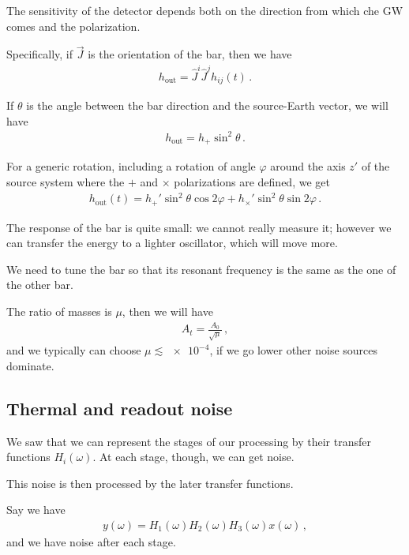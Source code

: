 \documentclass[main.tex]{subfiles}
\begin{document}
The sensitivity of the detector depends both on the direction from which che GW comes and the polarization.

Specifically, if \(\vec{J}\) is the orientation of the bar, then we have 
%
\begin{align}
h _{\text{out}} = \hat{J}^{i} \hat{J}^{j} h_{ij} (t)
\,.
\end{align}

If \(\theta \) is the angle between the bar direction and the source-Earth vector, we will have 
%
\begin{align}
h _{\text{out}} = h_{+} \sin^2\theta 
\,.
\end{align}

For a generic rotation, including a rotation of angle \(\varphi \) around the axis \(z'\) of the source system where the \(+\) and \(\times \) polarizations are defined, we get 
%
\begin{align}
h _{\text{out}} (t) = h_{+}' \sin^2\theta \cos 2 \varphi + h_{ \times }' \sin^2 \theta \sin 2 \varphi 
\,.
\end{align}

The response of the bar is quite small: we cannot really measure it; however we can transfer the energy to a lighter oscillator, which will move more. 

We need to tune the bar so that its resonant frequency is the same as the one of the other bar. 

The ratio of masses is \(\mu \), then we will have 
%
\begin{align}
A_t = \frac{A_0 }{\sqrt{\mu }}
\,,
\end{align}
%
and we typically can choose \(\mu \lesssim \num{e-4}\), if we go lower other noise sources dominate.

\subsection{Thermal and readout noise}

We saw that we can represent the stages of our processing by their transfer functions \(H_{i}(\omega )\). At each stage, though, we can get noise.

This noise is then processed by the later transfer functions. 

Say we have 
%
\begin{align}
y(\omega ) = H_1 (\omega ) H_2 (\omega ) H_3 (\omega ) x(\omega )
\,,
\end{align}
%
and we have noise after each stage. 
\end{document}
